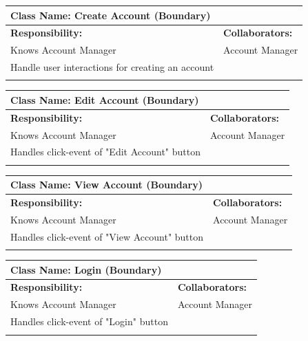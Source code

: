 \documentclass[]{article}
\begin{document}
\begin{itemize}
    \begin{table}[ht]
		\centering
		\begin{tabular}{|p{6cm}|p{6cm}|}
		\hline 
		\multicolumn{2}{|l|}{\textbf{Class Name: Create Account (Boundary)}} \\
		\hline
		\textbf{Responsibility:} & \textbf{Collaborators:} \\
		\hline
		Knows Account Manager & Account Manager\\
            Handle user interactions for creating an account &\\
		\vspace{1in} & \\
		\hline
		\end{tabular}
	\end{table}

        \begin{table}[ht]
		\centering
		\begin{tabular}{|p{6cm}|p{6cm}|}
		\hline 
		\multicolumn{2}{|l|}{\textbf{Class Name: Edit Account (Boundary)}} \\
		\hline
		\textbf{Responsibility:} & \textbf{Collaborators:} \\
		\hline
		Knows Account Manager & Account Manager\\
            Handles click-event of "Edit Account" button &\\
		\vspace{1in} & \\
		\hline
		\end{tabular}
	\end{table}

        \begin{table}[ht]
		\centering
		\begin{tabular}{|p{6cm}|p{6cm}|}
		\hline 
		\multicolumn{2}{|l|}{\textbf{Class Name: View Account (Boundary)}} \\
		\hline
		\textbf{Responsibility:} & \textbf{Collaborators:} \\
		\hline
		Knows Account Manager & Account Manager\\
            Handles click-event of "View Account" button &\\
		\vspace{1in} & \\
		\hline
		\end{tabular}
	\end{table}

        \begin{table}[ht]
		\centering
		\begin{tabular}{|p{6cm}|p{6cm}|}
		\hline 
		\multicolumn{2}{|l|}{\textbf{Class Name: Login (Boundary)}} \\
		\hline
		\textbf{Responsibility:} & \textbf{Collaborators:} \\
		\hline
		Knows Account Manager & Account Manager\\
            Handles click-event of "Login" button &\\
		\vspace{1in} & \\
		\hline
		\end{tabular}
	\end{table}


\end{itemize}
\end{document}
